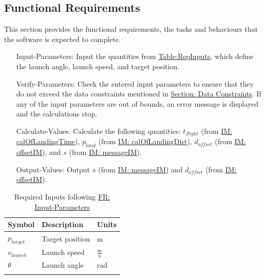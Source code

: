 \documentclass[12pt]{article}
\begin{document}
\subsection{Functional Requirements}
\label{Sec:FRs}
This section provides the functional requirements, the tasks and behaviours that the software is expected to complete.
\begin{itemize}
\item[Input-Parameters:\phantomsection\label{inputParams}]{Input the quantities from \hyperref[Table:ReqInputs]{Table:ReqInputs}, which define the launch angle, launch speed, and target position.}
\item[Verify-Parameters:\phantomsection\label{verifyParams}]{Check the entered input parameters to ensure that they do not exceed the data constraints mentioned in \hyperref[Sec:DataConstraints]{Section: Data Constraints}. If any of the input parameters are out of bounds, an error message is displayed and the calculations stop.}
\item[Calculate-Values:\phantomsection\label{calcValues}]{Calculate the following quantities: ${t_{flight}}$ (from \hyperref[IM:calOfLandingTime]{IM: calOfLandingTime}), ${p_{land}}$ (from \hyperref[IM:calOfLandingDist]{IM: calOfLandingDist}), ${d_{offset}}$ (from \hyperref[IM:offsetIM]{IM: offsetIM}), and $s$ (from \hyperref[IM:messageIM]{IM: messageIM}).}
\item[Output-Values:\phantomsection\label{outputValues}]{Output $s$ (from \hyperref[IM:messageIM]{IM: messageIM}) and ${d_{offset}}$ (from \hyperref[IM:offsetIM]{IM: offsetIM}).}
\end{itemize}
\begin{longtable}{l l l}
\toprule
\textbf{Symbol} & \textbf{Description} & \textbf{Units}
\\
\midrule
\endhead
${p_{target}}$ & Target position & m
\\
${v_{launch}}$ & Launch speed & $\frac{\text{m}}{\text{s}}$
\\
$θ$ & Launch angle & rad
\\
\bottomrule
\caption{Required Inputs following \hyperref[inputParams]{FR: Input-Parameters}}
\label{Table:ReqInputs}
\end{longtable}
\end{document}
